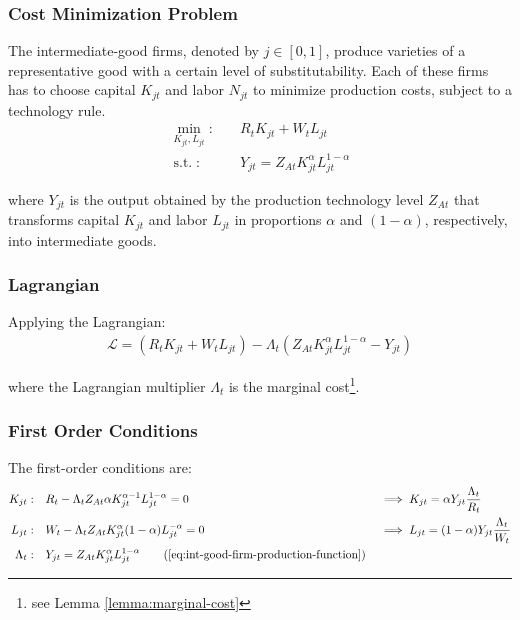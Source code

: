 \documentclass[
	12pt,
	]{article}
\numberwithin{equation}{section}
\DeclareMathOperator{\st}{s.t.}
\theoremstyle{definition}
\theoremstyle{plain}
\theoremstyle{plain}
\theoremstyle{plain}
\begin{document}
\subsubsection*{Cost Minimization Problem}

The intermediate-good firms, denoted by $j \in [0,1]$, produce varieties of a representative good with a certain level of substitutability. Each of these firms has to choose capital $K_{jt}$ and labor $N_{jt}$ to minimize production costs, subject to a technology rule.
\begin{align}
\label{eq:int-good-firm-total-cost}
	\min_{K_{jt}, L_{jt}}: \quad & R_t K_{jt} + W_t L_{jt} \\
\label{eq:int-good-firm-production-function}
	\st: \quad & Y_{jt} = Z_{At} K_{jt}^\alpha L_{jt}^{1-\alpha}
\end{align}

where $Y_{jt}$ is the output obtained by the production technology level $Z_{At}$\footnotemark{} that transforms capital $K_{jt}$ and labor $L_{jt}$ in proportions $\alpha$ and $(1-\alpha)$, respectively, into intermediate goods.


\subsubsection*{Lagrangian}

Applying the Lagrangian:
\begin{align}
\label{eq:int-good-firm-lagrangian}
	\mathcal{L} = (R_t K_{jt} + W_t L_{jt}) - \Lambda_t (Z_{At} K_{jt}^\alpha L_{jt}^{1-\alpha} - Y_{jt})
\end{align}

where the Lagrangian multiplier $\Lambda_t$ is the marginal cost\footnote{see Lemma \ref{lemma:marginal-cost}}.

\subsubsection*{First Order Conditions}

The first-order conditions are:
\begin{alignat}{2}
	K_{jt}: \quad & R_t - \Lambda_t Z_{At} \alpha K_{jt}^{\alpha-1} L_{jt}^{1-\alpha} = 0 &&\implies K_{jt} = \alpha Y_{jt} \frac{\Lambda_t}{R_t} \label{eq:int-good-firm-FOC-Kt} \\
	L_{jt}: \quad & W_t - \Lambda_t Z_{At} K_{jt}^\alpha (1-\alpha) L_{jt}^{-\alpha} = 0 \quad &&\implies L_{jt} = (1-\alpha) Y_{jt} \frac{\Lambda_t}{W_t} \label{eq:int-good-firm-FOC-Lt} \\
	\Lambda_t: \quad & Y_{jt} = Z_{At} K_{jt}^\alpha L_{jt}^{1-\alpha} \tag{\ref{eq:int-good-firm-production-function}}
\end{alignat}
\end{document}
